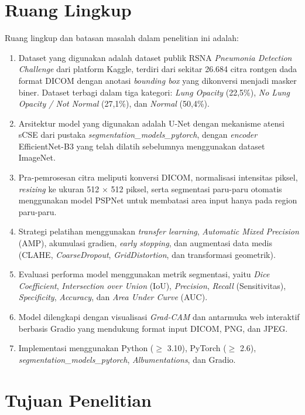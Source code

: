 \documentclass[12pt,a4paper,oneside]{book}
\begin{document}
\section{Ruang Lingkup}

Ruang lingkup dan batasan masalah dalam penelitian ini adalah:

\begin{enumerate}
  \item Dataset yang digunakan adalah dataset publik RSNA \textit{Pneumonia Detection Challenge} dari platform Kaggle, terdiri dari sekitar 26.684 citra rontgen dada format DICOM dengan anotasi \textit{bounding box} yang dikonversi menjadi masker biner. Dataset terbagi dalam tiga kategori: \textit{Lung Opacity} (22,5\%), \textit{No Lung Opacity / Not Normal} (27,1\%), dan \textit{Normal} (50,4\%).
  \item Arsitektur model yang digunakan adalah U-Net dengan mekanisme atensi sCSE dari pustaka \textit{segmentation\_models\_pytorch}, dengan \textit{encoder} EfficientNet-B3 yang telah dilatih sebelumnya menggunakan dataset ImageNet.
  \item Pra-pemrosesan citra meliputi konversi DICOM, normalisasi intensitas piksel, \textit{resizing} ke ukuran 512 $\times$ 512 piksel, serta segmentasi paru-paru otomatis menggunakan model PSPNet untuk membatasi area input hanya pada region paru-paru.
  \item Strategi pelatihan menggunakan \textit{transfer learning}, \textit{Automatic Mixed Precision} (AMP), akumulasi gradien, \textit{early stopping}, dan augmentasi data medis (CLAHE, \textit{CoarseDropout}, \textit{GridDistortion}, dan transformasi geometrik).
  \item Evaluasi performa model menggunakan metrik segmentasi, yaitu \textit{Dice Coefficient}, \textit{Intersection over Union} (IoU), \textit{Precision}, \textit{Recall} (Sensitivitas), \textit{Specificity}, \textit{Accuracy}, dan \textit{Area Under Curve} (AUC).
  \item Model dilengkapi dengan visualisasi \textit{Grad-CAM} dan antarmuka web interaktif berbasis Gradio yang mendukung format input DICOM, PNG, dan JPEG.
  \item Implementasi menggunakan Python ($\geq$ 3.10), PyTorch ($\geq$ 2.6), \textit{segmentation\_models\_pytorch}, \textit{Albumentations}, dan Gradio.
\end{enumerate}

\section{Tujuan Penelitian}
\end{document}
